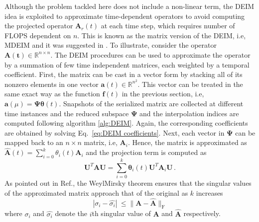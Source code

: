 \documentclass[]{interact}
\theoremstyle{plain}%
\theoremstyle{definition}
\theoremstyle{remark}
\begin{document}
Although the problem tackled here does not include a non-linear term, the DEIM idea is exploited to approximate time-dependent operators to avoid computing the projected operator $\mathbf{A}_r(t)$ at each time step, which requires number of FLOPS dependent on $n$.
This is known as the matrix version of the DEIM, i.e, MDEIM and it was suggested in \cite{carlberg2012efficient, benner2015survey}.
To illustrate, consider the operator $\mathbf{A}(\boldsymbol{t}) \in \mathbb{R}^{n\times n}$.
The DEIM procedures can be used to approximate the operator by a summation of few time independent matrices, each weighted by a temporal coefficient.
First, the matrix can be cast in a vector form by stacking all of its nonzero elements in one vector $\mathbf{a}(t) \in \mathbb{R}^{n^2}$.
This vector can be treated in the same exact way as the function $\mathbf{f}(t)$ in the previous section, i.e, $\mathbf{a}(\mu) = \mathbf{\Psi}\boldsymbol{\theta}(t)$.
Snapshots of the serialized matrix are collected at different time instances and the reduced subspace $\mathbf{\Psi}$ and the interpolation indices are computed following algorithm \ref{alg:DEIM}.
Again, the corresponding coefficients are obtained by solving Eq.~\ref{eq:DEIM coefficients}. 
Next, each vector in $\mathbf{\Psi}$ can be mapped back to an $n \times n$ matrix, i.e, $\textbf{A}_i$.
Hence, the matrix is approximated as $\mathbf{\hat{A}}(t)=\sum_{i=0}^k \theta_i(t) \mathbf{A}_i$ and the projection term is computed as
\begin{equation}
	\mathbf{U}^T\mathbf{A}\mathbf{U} = \sum_{i=0}^k \mathbf{\theta}_i(t)\mathbf{U}^T\mathbf{A}_i\mathbf{U} \, .
	\label{Eq:deim matrix projection}
\end{equation}
As pointed out in Ref.\cite{negri2015efficient}, the Weyl\textendash Mirsky theorem \cite{weyl1912asymptotische} ensures that the singular values of the approximated matrix approach that of the original as $k$ increases 
\begin{equation}
	|\sigma_i - \hat{\sigma_i}  |\ \le \|\mathbf{A} - \hat{\mathbf{A}}\|_\text{F}
\end{equation}
where $\sigma_i$ and $\hat{\sigma_i}$ denote the $i$th singular value of $\mathbf{A}$ and $\hat{\mathbf{A}}$ respectively.
\end{document}
